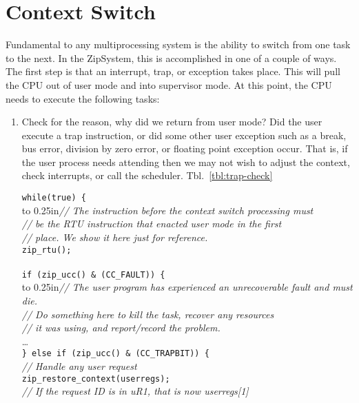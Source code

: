 \documentclass{gqtekspec}
\begin{document}
\section{Context Switch}

Fundamental to any multiprocessing system is the ability to switch from one
task to the next.  In the ZipSystem, this is accomplished in one of a couple of
ways.  The first step is that an interrupt, trap, or exception takes place.
This will pull the CPU out of user mode and into supervisor mode.  At this
point, the CPU needs to execute the following tasks:
\begin{enumerate}
\item Check for the reason, why did we return from user mode?  Did the user
	execute a trap instruction, or did some other user exception such as a
	break, bus error, division by zero error, or floating point exception
	occur.  That is, if the user process needs attending then we may not
	wish to adjust the context, check interrupts, or call the scheduler. 
	Tbl.~\ref{tbl:trap-check}
\begin{table}\begin{center}
\begin{tabbing}
{\tt while(true) \{} \\
	\hbox to 0.25in{}\={\em // The instruction before the context switch processing must} \\
\>	{\em // be the RTU instruction that enacted user mode in the first} \\
\>	{\em // place.  We show it here just for reference.} \\
\>	{\tt zip\_rtu();} \\
\\
\>	{\tt if (zip\_ucc() \& (CC\_FAULT)) \{} \\
\>	\hbox to 0.25in{}\={\em // The user program has experienced an unrecoverable fault and must die.}\\
\>\>	{\em // Do something here to kill the task, recover any resources} \\
\>\>		{\em // it was using, and report/record the problem.}\\
\>\>		\ldots \\
\>	{\tt \} else if (zip\_ucc() \& (CC\_TRAPBIT)) \{} \\
\>\>		{\em // Handle any user request} \\
\>\>		{\tt zip\_restore\_context(userregs);} \\
\>\>		{\em // If the request ID is in uR1, that is now userregs[1]}\\

\end{tabbing}
\end{center}
\end{table}
\end{enumerate}
\end{document}
